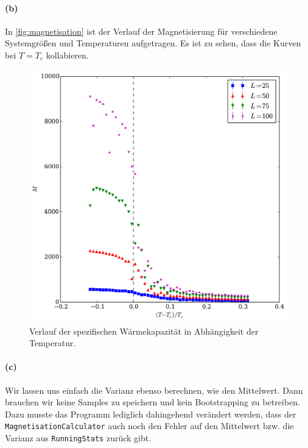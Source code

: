 \documentclass{scrartcl}
\begin{document}
\paragraph{(b)} In \autoref{fig:magnetisation} ist der Verlauf der Magnetisierung für verschiedene Systemgrößen und Temperaturen aufgetragen. Es ist zu sehen, dass die Kurven bei $T = T_c$ kollabieren.

\begin{figure}[H]
    \centering
    \includegraphics[width=.5\textwidth]{plots/magnetisation.pdf}
    \caption{Verlauf der spezifischen Wärmekapazität in Abhängigkeit der Temperatur.}
    \label{fig:magnetisation}
\end{figure}


\paragraph{(c)} Wir lassen uns einfach die Varianz ebenso berechnen, wie den Mittelwert. Dann brauchen wir keine Samples zu speichern und kein Bootstrapping zu betreiben. Dazu musste das Programm lediglich dahingehend verändert werden, dass der \texttt{MagnetisationCalculator} auch noch den Fehler auf den Mittelwert bzw. die Varianz aus \texttt{RunningStats} zurück gibt.
\end{document}
